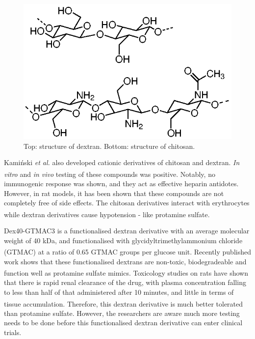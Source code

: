 \begin{figure} [ht!]
\centering
\includegraphics[scale=1.0]{Figures/dextran+chitosan_structure.eps}
\caption{Top: structure of dextran. \newline
Bottom: structure of chitosan.}
\label{dextran+chitosan_structure}
\end{figure}
Kami\'{n}ski \textit{et al.} also developed cationic derivatives of chitosan and dextran. \textit{ In vitro} and \textit{in vivo} testing of these compounds was positive.\textsuperscript{\cite{Kaminski2014NewReversal}}  Notably, no immunogenic response was shown, and they act as effective heparin antidotes. However, in rat models, it has been shown that these compounds are not completely free of side effects. The chitosan derivatives interact with erythrocytes while dextran derivatives cause hypotension - like protamine sulfate.\textsuperscript{\cite{Kaminski2014NewReversal}} 

Dex40-GTMAC3 is a functionalised dextran derivative with an average molecular weight of 40 kDa, and functionalised with glycidyltrimethylammonium chloride (GTMAC) at a ratio of 0.65 GTMAC groups per glucose unit.\textsuperscript{\cite{Sokolowska2016TheHeparin}} Recently published work shows that these functionalised dextrans are non-toxic, biodegradeable and function well as protamine sulfate mimics.\textsuperscript{\cite{Kalaska2015NonclinicalHeparin}} Toxicology studies on rats have shown that there is rapid renal clearance of the drug, with plasma concentration falling to less than half of that administered after 10 minutes, and little in terms of tissue accumulation.\textsuperscript{\cite{Kalaska2015NonclinicalHeparin}}  Therefore, this dextran derivative is much better tolerated than protamine sulfate. However, the researchers are aware much more testing needs to be done before this functionalised dextran derivative can enter clinical trials. 

